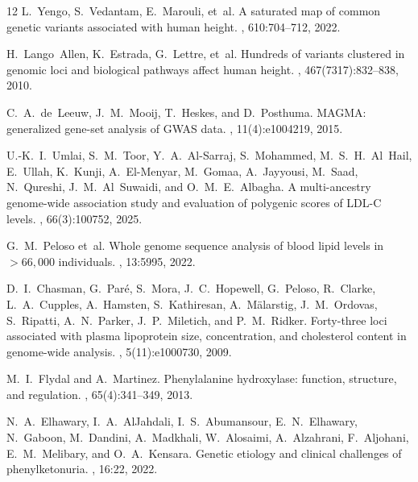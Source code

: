 \documentclass[unnumsec,webpdf,contemporary,large]{oup-authoring-template}%
\theoremstyle{thmstyleone}%
\theoremstyle{thmstyletwo}%
\theoremstyle{thmstylethree}%
\begin{document}
\begin{thebibliography}{12}
L.~Yengo, S.~Vedantam, E.~Marouli, et~al.
\newblock A saturated map of common genetic variants associated with human height.
, 610:704--712, 2022.

H.~Lango~Allen, K.~Estrada, G.~Lettre, et~al.
\newblock Hundreds of variants clustered in genomic loci and biological pathways affect human height.
, 467(7317):832--838, 2010.

C.~A.~de~Leeuw, J.~M.~Mooij, T.~Heskes, and D.~Posthuma.
\newblock MAGMA: generalized gene-set analysis of GWAS data.
, 11(4):e1004219, 2015.

U.-K.~I.~Umlai, S.~M.~Toor, Y.~A.~Al-Sarraj, S.~Mohammed, M.~S.~H.~Al~Hail, E.~Ullah, K.~Kunji, A.~El-Menyar, M.~Gomaa, A.~Jayyousi, M.~Saad, N.~Qureshi, J.~M.~Al~Suwaidi, and O.~M.~E.~Albagha.
\newblock A multi-ancestry genome-wide association study and evaluation of polygenic scores of LDL-C levels.
, 66(3):100752, 2025.

G.~M.~Peloso et~al.
\newblock Whole genome sequence analysis of blood lipid levels in $>66{,}000$ individuals.
, 13:5995, 2022.

D.~I.~Chasman, G.~Par\'e, S.~Mora, J.~C.~Hopewell, G.~Peloso, R.~Clarke, L.~A.~Cupples, A.~Hamsten, S.~Kathiresan, A.~M\"alarstig, J.~M.~Ordovas, S.~Ripatti, A.~N.~Parker, J.~P.~Miletich, and P.~M.~Ridker.
\newblock Forty-three loci associated with plasma lipoprotein size, concentration, and cholesterol content in genome-wide analysis.
, 5(11):e1000730, 2009.

M.~I.~Flydal and A.~Martinez.
\newblock Phenylalanine hydroxylase: function, structure, and regulation.
, 65(4):341--349, 2013.

N.~A.~Elhawary, I.~A.~AlJahdali, I.~S.~Abumansour, E.~N.~Elhawary, N.~Gaboon, M.~Dandini, A.~Madkhali, W.~Alosaimi, A.~Alzahrani, F.~Aljohani, E.~M.~Melibary, and O.~A.~Kensara.
\newblock Genetic etiology and clinical challenges of phenylketonuria.
, 16:22, 2022.


\end{thebibliography}
\end{document}

